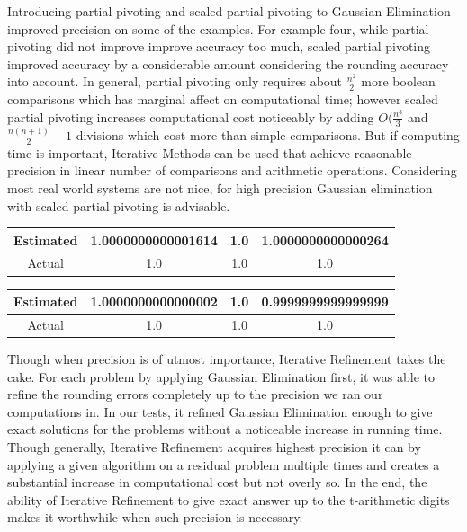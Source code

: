 \documentclass[11pt]{article}	%
\begin{document}
Introducing partial pivoting and scaled partial pivoting to Gaussian Elimination improved precision on some of the examples. For example four, while partial pivoting did not improve improve accuracy too much, scaled partial pivoting improved accuracy by a considerable amount considering the rounding accuracy into account. In general, partial pivoting only requires about $\frac{n^2}{2}$ more boolean comparisons which has marginal affect on computational time; however scaled partial pivoting increases computational cost noticeably by adding $O(\frac{n^3}{3}$ and $\frac{n(n+1)}{2} - 1$ divisions which cost more than simple comparisons. But if computing time is important, Iterative Methods can be used that achieve reasonable precision in linear number of comparisons and arithmetic operations. Considering most real world systems are not nice, for high precision Gaussian elimination with scaled partial pivoting is advisable.

\begin{center}
	 \label{tab:title}
    \begin{tabular}{||c|c|c|c||}
        \hline
        Estimated & 1.0000000000001614 & 1.0 &  1.0000000000000264 \\ [.25em]
        \hline\hline
        Actual & 1.0 & 1.0 & 1.0 \\ [.25em]
        \hline
    \end{tabular}
\end{center}

\begin{center}
	 \label{tab:title}
    \begin{tabular}{||c|c|c|c||}
        \hline
        Estimated & 1.0000000000000002 & 1.0 &  0.9999999999999999 \\ [.25em]
        \hline\hline
        Actual & 1.0 & 1.0 & 1.0 \\ [.25em]
        \hline
    \end{tabular}
\end{center}

Though when precision is of utmost importance, Iterative Refinement takes the cake. For each problem by applying Gaussian Elimination first, it was able to refine the rounding errors completely up to the precision we ran our computations in. In our tests, it refined Gaussian Elimination enough to give exact solutions for the problems without a noticeable increase in running time. Though generally, Iterative Refinement acquires highest precision it can by applying a given algorithm on a residual problem multiple times and creates a substantial increase in computational cost but not overly so. In the end, the ability of Iterative Refinement to give exact answer up to the t-arithmetic digits makes it worthwhile when such precision is necessary.
\end{document}
